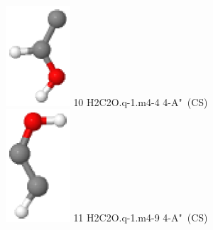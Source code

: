 \documentclass[10pt]{article}
\begin{document}
\begin{tabular}
\includegraphics[width=2.40000000000000000000cm]{H2C2O.q-1.m4-4.eps} \tiny{10 \hspace{1.20000000000000000000cm} H2C2O.q-1.m4-4 \hspace{5pt} 4-A"~(CS)} 
\\\hline
\includegraphics[width=2.40000000000000000000cm]{H2C2O.q-1.m4-9.eps} \tiny{11 \hspace{1.20000000000000000000cm} H2C2O.q-1.m4-9 \hspace{5pt} 4-A"~(CS)} 
\\
\end{tabular}
\end{document}
